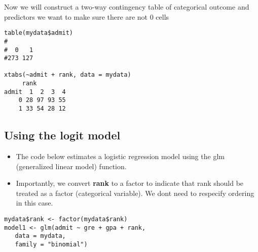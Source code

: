 \documentclass[]{article}
\begin{document}
\begin{framed}
Now we will construct a two-way contingency table of categorical outcome and predictors we want to make sure there are not 0 cells
\begin{verbatim}
table(mydata$admit)
#
#  0   1 
#273 127 

xtabs(~admit + rank, data = mydata)
     rank
admit  1  2  3  4
    0 28 97 93 55
    1 33 54 28 12
\end{verbatim}
\end{framed}
\subsection{Using the logit model}
\begin{itemize}
\item The code below estimates a logistic regression model using the glm (generalized linear model) function. \item Importantly, we convert \textbf{rank} to a factor to indicate that rank should be treated as a factor (categorical variable). We dont need to respecify ordering in this case.
\end{itemize}

\begin{framed}
\begin{verbatim}
mydata$rank <- factor(mydata$rank)
model1 <- glm(admit ~ gre + gpa + rank, 
   data = mydata, 
   family = "binomial")
\end{verbatim}
\end{framed}
\end{document}
